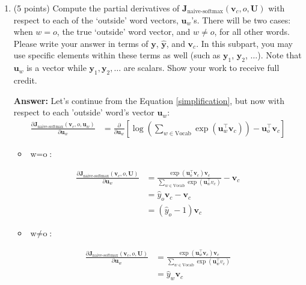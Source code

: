 \documentclass{article}
\newenvironment{answer}{
    {\bf Answer:} \sf \begingroup\color{red}
}{\endgroup}%
\begin{document}
\begin{enumerate}[label=(\alph*)]
\begin{shaded}
\begin{answer}
\end{answer}
\end{shaded}

\item (5 points) Compute the partial derivatives of $\bm J_{\text{naive-softmax}}(\bm v_c, o, \bm U)$ with respect to each of the `outside' word vectors, $\bm u_w$'s. There will be two cases: when $w=o$, the true `outside' word vector, and $w \neq o$, for all other words. Please write your answer in terms of $\bm y$, $\hat{\bm y}$, and $\bm v_c$. In this subpart, you may use specific elements within these terms as well (such as $\bm y_1$, $\bm y_2$, $\dots$). Note that $\bm u_w$ is a vector while $\bm y_1, \bm y_2, \dots$ are scalars. Show your work to receive full credit.

\begin{shaded} \newpage
\begin{answer} Let's continue from the Equation \ref{simplification}, but now with respect to each 'outside' word's vector $\bm u_w$: 
\begin{align}
\frac{\partial \bm J_{\text{naive-softmax}}(\bm v_c, o, \bm u_w)}{\partial \bm u_w} &= \frac{\partial}{\partial \bm u_w} \left[\log\left(\sum_{w \in \text{Vocab}} \exp(\bm u_{w}^\top \bm v_c)\right)-\bm u_{o}^\top \bm v_c\right]
\end{align}

\begin{itemize}
    \item $\text{w} = \text{o}$:
\end{itemize}

\begin{align}
\frac{\partial \bm J_{\text{naive-softmax}}(\bm v_c, o, \bm U)}{\partial \bm u_w} &= \frac{\exp(\bm u_o^\top \bm v_c) \bm v_c}{\sum_{w \in \text{Vocab}} \exp(\bm u_w^\top v_c)} - \bm v_c \\
&= \hat{y}_o \bm v_c - \bm v_c \\
&= (\hat{y}_o - 1) \bm v_c
\end{align}

\begin{itemize}
    \item $\text{w} \neq \text{o}$:
\end{itemize}

\begin{align}
\frac{\partial \bm J_{\text{naive-softmax}}(\bm v_c, o, \bm U)}{\partial \bm u_w} &= \frac{\exp(\bm u_w^\top \bm v_c) \bm v_c}{\sum_{w \in \text{Vocab}} \exp(\bm u_w^\top v_c)} \\
&= \hat{y}_w \bm v_c
\end{align}
\end{answer}
\end{shaded}


\end{enumerate}
\end{document}
